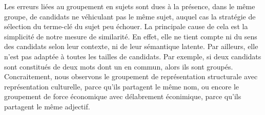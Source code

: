         Les erreurs liées au groupement en sujets sont dues à la présence, dans
        le même groupe, de candidats ne véhiculant pas le même sujet, auquel cas
        la stratégie de sélection du terme-clé du sujet peu échouer. La
        principale cause de cela est la simplicité de notre mesure de
        similarité. En effet, elle ne tient compte ni du sens des candidats
        selon leur contexte, ni de leur sémantique latente. Par ailleurs, elle
        n'est pas adaptée à toutes les tailles de candidats. Par exemple, si
        deux candidats sont constitués de deux mots dont un en commun, alors ils
        sont groupés. Concraitement, nous observons le groupement de
        \og{}représentation structurale\fg{} avec \og{}représentation
        culturelle\fg{}, parce qu'ils partagent le même nom, ou encore le
        groupement de \og{}force économique\fg{} avec \og{}délabrement
        éconimique\fg{}, parce qu'ils partagent le même adjectif.

